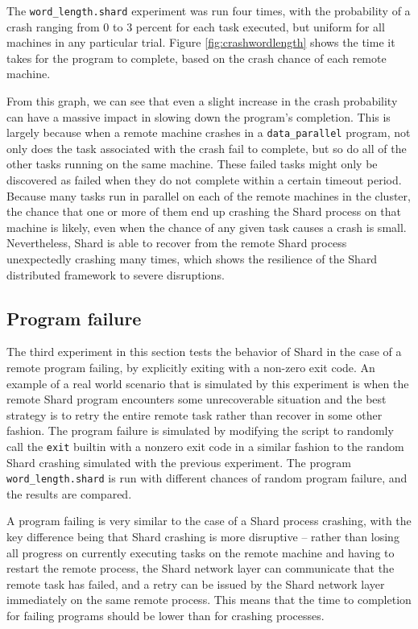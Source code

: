 \documentclass[oneside]{report}
\begin{document}
The \texttt{word\_length.shard} experiment was run four times, with the probability of a crash ranging from 0 to 3 percent for each task executed, but uniform for all machines in any particular trial.
Figure \ref{fig:crashwordlength} shows the time it takes for the program to complete, based on the crash chance of each remote machine.

From this graph, we can see that even a slight increase in the crash probability can have a massive impact in slowing down the program's completion.
This is largely because when a remote machine crashes in a \texttt{data\_parallel} program, not only does the task associated with the crash fail to complete, but so do all of the other tasks running on the same machine.
These failed tasks might only be discovered as failed when they do not complete within a certain timeout period.
Because many tasks run in parallel on each of the remote machines in the cluster, the chance that one or more of them end up crashing the Shard process on that machine is likely, even when the chance of any given task causes a crash is small.
Nevertheless, Shard is able to recover from the remote Shard process unexpectedly crashing many times, which shows the resilience of the Shard distributed framework to severe disruptions.

\subsection{Program failure}
The third experiment in this section tests the behavior of Shard in the case of a remote program failing, by explicitly exiting with a non-zero exit code.
An example of a real world scenario that is simulated by this experiment is when the remote Shard program encounters some unrecoverable situation and the best strategy is to retry the entire remote task rather than recover in some other fashion.
The program failure is simulated by modifying the script to randomly call the \texttt{exit} builtin with a nonzero exit code in a similar fashion to the random Shard crashing simulated with the previous experiment.
The program \texttt{word\_length.shard} is run with different chances of random program failure, and the results are compared.

A program failing is very similar to the case of a Shard process crashing, with the key difference being that Shard crashing is more disruptive -- rather than losing all progress on currently executing tasks on the remote machine and having to restart the remote process, the Shard network layer can communicate that the remote task has failed, and a retry can be issued by the Shard network layer immediately on the same remote process.
This means that the time to completion for failing programs should be lower than for crashing processes.
\end{document}
